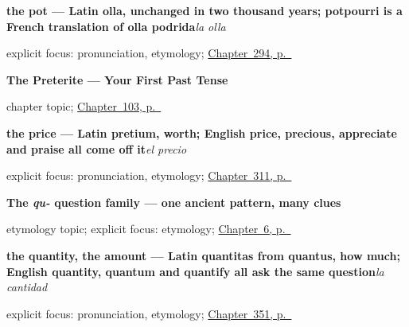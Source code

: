 \noindent\begin{minipage}[t]{\linewidth}
\raggedright
\textbf{the pot — Latin olla, unchanged in two thousand years; potpourri is a French translation of olla podrida}\enspace\emph{la olla}\par
\footnotesize explicit focus: pronunciation, etymology; \hyperref[ch:cinco-cosas-mas]{Chapter~294, p.~\pageref*{ch:cinco-cosas-mas}}
\end{minipage}\par\smallskip

\noindent\begin{minipage}[t]{\linewidth}
\raggedright
\textbf{The Preterite --- Your First Past Tense}\par
\footnotesize chapter topic; \hyperref[ch:preterite]{Chapter~103, p.~\pageref*{ch:preterite}}
\end{minipage}\par\smallskip

\noindent\begin{minipage}[t]{\linewidth}
\raggedright
\textbf{the price — Latin pretium, worth; English price, precious, appreciate and praise all come off it}\enspace\emph{el precio}\par
\footnotesize explicit focus: pronunciation, etymology; \hyperref[ch:la-tienda-y-la-cuenta]{Chapter~311, p.~\pageref*{ch:la-tienda-y-la-cuenta}}
\end{minipage}\par\smallskip

\noindent\begin{minipage}[t]{\linewidth}
\raggedright
\textbf{The \emph{qu-} question family — one ancient pattern, many clues}\par
\footnotesize etymology topic; explicit focus: etymology; \hyperref[ch:asking-a-name]{Chapter~6, p.~\pageref*{ch:asking-a-name}}
\end{minipage}\par\smallskip

\noindent\begin{minipage}[t]{\linewidth}
\raggedright
\textbf{the quantity, the amount — Latin quantitas from quantus, how much; English quantity, quantum and quantify all ask the same question}\enspace\emph{la cantidad}\par
\footnotesize explicit focus: pronunciation, etymology; \hyperref[ch:cien-y-la-cantidad]{Chapter~351, p.~\pageref*{ch:cien-y-la-cantidad}}
\end{minipage}\par\smallskip

